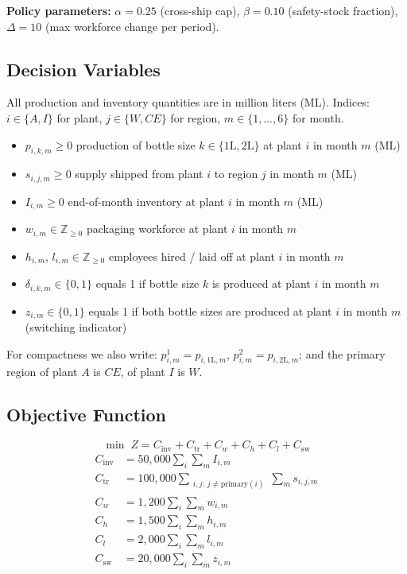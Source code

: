 \documentclass[12pt,a4paper]{article}
\begin{document}
\textbf{Policy parameters:}
$\alpha=0.25$ (cross-ship cap),
$\beta=0.10$ (safety-stock fraction),
$\Delta=10$ (max workforce change per period).

\subsection*{Decision Variables}

All production and inventory quantities are in million liters (ML).
Indices: $i\in\{A,I\}$ for plant, $j\in\{W,CE\}$ for region, $m\in\{1,\ldots,6\}$ for month.

\begin{itemize}
  \item $p_{i,k,m}\geq 0$ \quad production of bottle size $k\in\{1\text{L},2\text{L}\}$
        at plant $i$ in month $m$ (ML)
  \item $s_{i,j,m}\geq 0$ \quad supply shipped from plant $i$ to region $j$ in month $m$ (ML)
  \item $I_{i,m}\geq 0$ \quad end-of-month inventory at plant $i$ in month $m$ (ML)
  \item $w_{i,m}\in\mathbb{Z}_{\geq0}$ \quad packaging workforce at plant $i$ in month $m$
  \item $h_{i,m},\,l_{i,m}\in\mathbb{Z}_{\geq0}$ \quad employees hired / laid off at plant $i$
        in month $m$
  \item $\delta_{i,k,m}\in\{0,1\}$ \quad equals 1 if bottle size $k$ is produced at plant $i$
        in month $m$
  \item $z_{i,m}\in\{0,1\}$ \quad equals 1 if both bottle sizes are produced at plant $i$ in
        month $m$ (switching indicator)
\end{itemize}

For compactness we also write: $p^1_{i,m}=p_{i,1\text{L},m}$, $p^2_{i,m}=p_{i,2\text{L},m}$;
and the primary region of plant $A$ is $CE$, of plant $I$ is $W$.

\subsection*{Objective Function}

\[
\min\; Z = C_{\text{inv}}+C_{\text{tr}}+C_w+C_h+C_l+C_{\text{sw}}
\]
\begin{align*}
C_{\text{inv}} &= 50{,}000\sum_{i}\sum_{m} I_{i,m} \\
C_{\text{tr}}  &= 100{,}000\!\!\!\sum_{\substack{i,j:\,j\neq \text{primary}(i)}}\sum_{m} s_{i,j,m} \\
C_w            &= 1{,}200\sum_{i}\sum_{m} w_{i,m} \\
C_h            &= 1{,}500\sum_{i}\sum_{m} h_{i,m} \\
C_l            &= 2{,}000\sum_{i}\sum_{m} l_{i,m} \\
C_{\text{sw}}  &= 20{,}000\sum_{i}\sum_{m} z_{i,m}
\end{align*}
\end{document}
